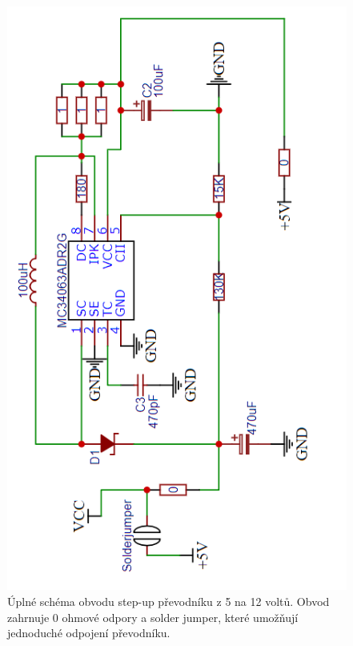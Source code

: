 \documentclass[11pt,a4paper,twoside,openright]{report}
\begin{document}
\begin{figure}[ht!]
  \includegraphics[width=0.8\linewidth]{img/boost_converter.png}
  \centering
  \caption{Úplné schéma obvodu step-up převodníku z 5 na 12 voltů. Obvod zahrnuje 0 ohmové odpory a solder jumper, které umožňují jednoduché odpojení převodníku.}
  \label{appendix:boost_converter}
\end{figure}
\end{document}
